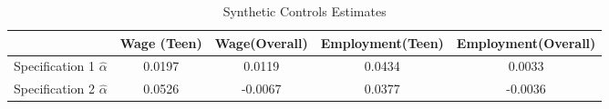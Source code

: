 \begin{table}[htbp]\centering
\caption{Synthetic Controls Estimates}
\begin{tabular}{l*{4}{c}}
\toprule
            & Wage (Teen)&Wage(Overall)&Employment(Teen)&Employment(Overall)\\
\midrule
Specification 1 $\hat{\alpha}$&      0.0197&      0.0119&      0.0434&      0.0033\\
Specification 2 $\hat{\alpha}$&      0.0526&     -0.0067&      0.0377&     -0.0036\\
\bottomrule
\end{tabular}
\end{table}
